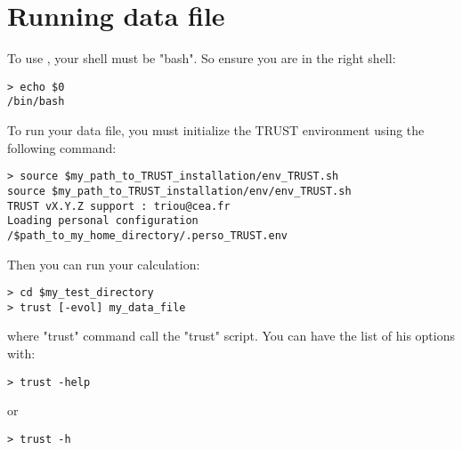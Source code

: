 \section{Running data file}\label{Run}
To use \trust, your shell must be "bash". So ensure you are in the right shell:
\begin{verbatim}
> echo $0
/bin/bash
\end{verbatim}

To run your data file, you must initialize the TRUST environment using the following command:
\begin{verbatim}
> source $my_path_to_TRUST_installation/env_TRUST.sh
source $my_path_to_TRUST_installation/env/env_TRUST.sh
TRUST vX.Y.Z support : triou@cea.fr
Loading personal configuration /$path_to_my_home_directory/.perso_TRUST.env
\end{verbatim}

Then you can run your calculation:
\begin{verbatim}
> cd $my_test_directory
> trust [-evol] my_data_file
\end{verbatim}

where "trust" command call the "trust" script.
You can have the list of his options with:
\begin{verbatim}
> trust -help
\end{verbatim}
or
\begin{verbatim}
> trust -h
\end{verbatim}

